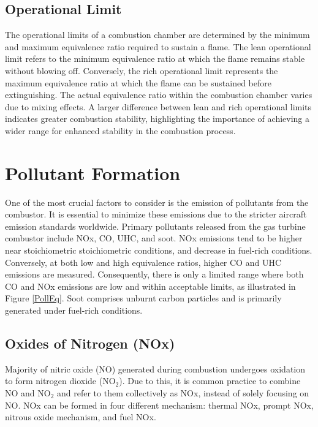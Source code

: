 \subsection{Operational Limit}
The operational limits of a combustion chamber are determined by the minimum and maximum equivalence ratio required to sustain a flame. The lean operational limit refers to the minimum equivalence ratio at which the flame remains stable without blowing off. Conversely, the rich operational limit represents the maximum equivalence ratio at which the flame can be sustained before extinguishing. The actual equivalence ratio within the combustion chamber varies due to mixing effects. A larger difference between lean and rich operational limits indicates greater combustion stability, highlighting the importance of achieving a wider range for enhanced stability in the combustion process.

\section{Pollutant Formation}
One of the most crucial factors to consider is the emission of pollutants from the combustor. It is essential to minimize these emissions due to the stricter aircraft emission standards worldwide. Primary pollutants released from the gas turbine combustor include NOx, CO, UHC, and soot. NOx emissions tend to be higher near stoichiometric stoichiometric conditions, and decrease in fuel-rich conditions. Conversely, at both low and high equivalence ratios, higher CO and UHC emissions are measured. Consequently, there is only a limited range where both CO and NOx emissions are low and within acceptable limits, as illustrated in Figure \ref{PollEq}. Soot comprises unburnt carbon particles and is primarily generated under fuel-rich conditions.

\subsection{Oxides of Nitrogen (NOx)}
Majority of nitric oxide (NO) generated during combustion undergoes oxidation to form nitrogen dioxide (NO$_2$). Due to this, it is common practice to combine NO and NO$_2$ and refer to them collectively as NOx, instead of solely focusing on NO. NOx can be formed in four different mechanism: thermal NOx, prompt NOx, nitrous oxide mechanism, and fuel NOx\cite{Carvalho2024}.


